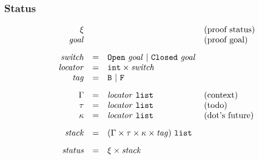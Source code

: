 \subsubsection{Status}

\[
\begin{array}{rcll}
 \xi & & & \mbox{(proof status)} \\
 \mathit{goal} & & & \mbox{(proof goal)} \\[2ex]

 \mathit{switch} & = & \mathtt{Open}~\mathit{goal} ~ | ~ \mathtt{Closed}~\mathit{goal} & \\
 \mathit{locator} & = & \mathtt{int}\times\mathit{switch} & \\
 \mathit{tag} & = & \mathtt{B} ~ | ~ \mathtt{F} \\[2ex]

 \Gamma & = & \mathit{locator}~\mathtt{list} & \mbox{(context)} \\
 \tau & = & \mathit{locator}~\mathtt{list} & \mbox{(todo)} \\
 \kappa & = & \mathit{locator}~\mathtt{list} & \mbox{(dot's future)} \\[2ex]

 \mathit{stack} & = & (\Gamma\times\tau\times\kappa\times\mathit{tag})~\mathtt{list}
 \\[2ex]

 \mathit{status} & = & \xi\times\mathit{stack} \\
\end{array}
\]

